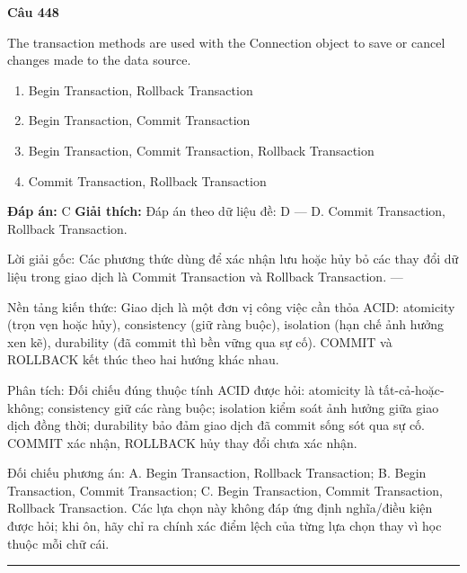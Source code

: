 \documentclass[11pt,a4paper]{article}
\newenvironment{question}[1]{%
  \par\vspace{1em}\noindent\textbf{\large Câu #1}\par\vspace{0.4em}
}{%
  \par\vspace{1em}\hrule\vspace{0.6em}
}
\newenvironment{choices}{%
  \begin{enumerate}[label=\textbf{\Alph*.},leftmargin=2.2em,itemsep=2pt,topsep=3pt]
}{%
  \end{enumerate}
}
\newcommand{\choice}{\item}
\begin{document}
\begin{question}{448}
The transaction methods are used with the Connection object to save or cancel changes made to the data source.
\begin{choices}
\choice Begin Transaction, Rollback Transaction
\choice Begin Transaction, Commit Transaction
\choice Begin Transaction, Commit Transaction, Rollback Transaction
\choice Commit Transaction, Rollback Transaction
\end{choices}
\textbf{Đáp án:} C
\textbf{Giải thích:} Đáp án theo dữ liệu đề: D — D. Commit Transaction, Rollback Transaction.

Lời giải gốc: Các phương thức dùng để xác nhận lưu hoặc hủy bỏ các thay đổi dữ liệu trong giao dịch là Commit Transaction và Rollback Transaction. ---

Nền tảng kiến thức: Giao dịch là một đơn vị công việc cần thỏa ACID: atomicity (trọn vẹn hoặc hủy), consistency (giữ ràng buộc), isolation (hạn chế ảnh hưởng xen kẽ), durability (đã commit thì bền vững qua sự cố). COMMIT và ROLLBACK kết thúc theo hai hướng khác nhau.

Phân tích: Đối chiếu đúng thuộc tính ACID được hỏi: atomicity là tất-cả-hoặc-không; consistency giữ các ràng buộc; isolation kiểm soát ảnh hưởng giữa giao dịch đồng thời; durability bảo đảm giao dịch đã commit sống sót qua sự cố. COMMIT xác nhận, ROLLBACK hủy thay đổi chưa xác nhận.

Đối chiếu phương án: A. Begin Transaction, Rollback Transaction; B. Begin Transaction, Commit Transaction; C. Begin Transaction, Commit Transaction, Rollback Transaction. Các lựa chọn này không đáp ứng định nghĩa/điều kiện được hỏi; khi ôn, hãy chỉ ra chính xác điểm lệch của từng lựa chọn thay vì học thuộc mỗi chữ cái.
\end{question}
\end{document}
